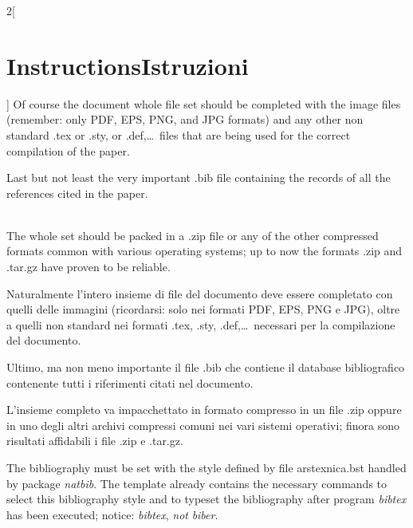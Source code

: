 \documentclass[12pt]{article}
\providecommand\file[1]{\textnormal{\ttfamily#1}}
\providecommand\pack[1]{\textnormal{\sffamily\slshape#1}}
\providecommand\prog[1]{\textnormal{\ttfamily\itshape#1}}
\providecommand\italian{\selectlanguage{italian}}
\providecommand\english{\selectlanguage{english}}
\begin{document}
\begin{paracol}{2}[\section{Instructions\hspace{5.6em}Istruzioni}]
\english
Of course the document whole file set should be completed with the image files (remember: only PDF, EPS, PNG, and JPG formats) and any other non standard \file{.tex} or \file{.sty}, or \file{.def},\dots\ files that are being used for the correct compilation of the paper.

Last but not least the very important \file{.bib} file containing the records of all the references cited in the paper.\\~

The whole set should be packed in a \file{.zip} file or any of the other compressed formats common with various operating systems; up to now the formats \file{.zip} and \file{.tar.gz} have proven to be reliable.

\italian

Naturalmente l'intero insieme di file del documento deve essere completato con quelli delle immagini (ricordarsi: solo nei formati PDF, EPS, PNG e JPG), oltre a quelli non standard nei formati \file{.tex}, \file{.sty}, \file{.def},\dots\ necessari per la compilazione del documento.

Ultimo, ma non meno importante il file \file{.bib} che contiene il database bibliografico contenente tutti i riferimenti citati nel documento.

L'insieme completo va impacchettato in formato compresso in un file \file{.zip} oppure in uno degli altri archivi compressi comuni nei vari sistemi operativi; finora sono risultati affidabili i file \file{.zip} e \file{.tar.gz}.

\english
The bibliography must be set with the style defined by file \file{arstexnica.bst} handled by package \pack{natbib}. The template already contains the necessary commands to select this bibliography style and to typeset the bibliography after program \prog{bibtex} has been executed; notice: \prog{bibtex}, \emph{not} \prog{biber}.


\end{paracol}
\end{document}
